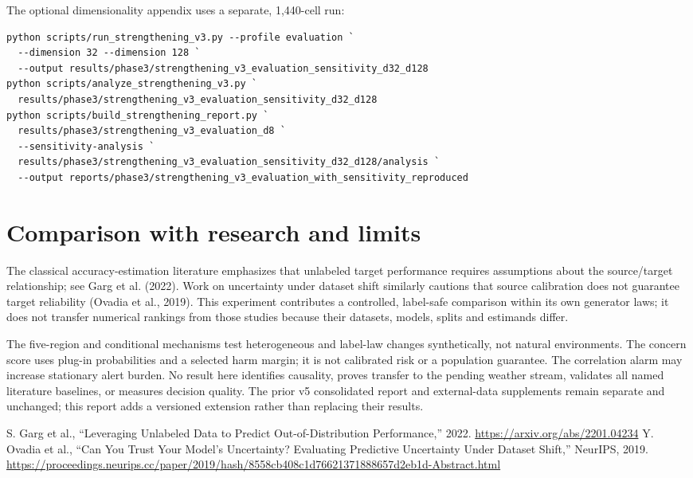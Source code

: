 \documentclass[11pt,a4paper]{article}
\begin{document}
The optional dimensionality appendix uses a separate, 1,440-cell run:
\begin{verbatim}
python scripts/run_strengthening_v3.py --profile evaluation `
  --dimension 32 --dimension 128 `
  --output results/phase3/strengthening_v3_evaluation_sensitivity_d32_d128
python scripts/analyze_strengthening_v3.py `
  results/phase3/strengthening_v3_evaluation_sensitivity_d32_d128
python scripts/build_strengthening_report.py `
  results/phase3/strengthening_v3_evaluation_d8 `
  --sensitivity-analysis `
  results/phase3/strengthening_v3_evaluation_sensitivity_d32_d128/analysis `
  --output reports/phase3/strengthening_v3_evaluation_with_sensitivity_reproduced
\end{verbatim}

\section{Comparison with research and limits}
The classical accuracy-estimation literature emphasizes that unlabeled target performance requires assumptions about the source/target relationship; see Garg et al. (2022). Work on uncertainty under dataset shift similarly cautions that source calibration does not guarantee target reliability (Ovadia et al., 2019). This experiment contributes a controlled, label-safe comparison within its own generator laws; it does not transfer numerical rankings from those studies because their datasets, models, splits and estimands differ.

The five-region and conditional mechanisms test heterogeneous and label-law changes synthetically, not natural environments. The concern score uses plug-in probabilities and a selected harm margin; it is not calibrated risk or a population guarantee. The correlation alarm may increase stationary alert burden. No result here identifies causality, proves transfer to the pending weather stream, validates all named literature baselines, or measures decision quality. The prior v5 consolidated report and external-data supplements remain separate and unchanged; this report adds a versioned extension rather than replacing their results.

\begin{thebibliography}{9}
S. Garg et al., ``Leveraging Unlabeled Data to Predict Out-of-Distribution Performance,'' 2022. \url{https://arxiv.org/abs/2201.04234}
Y. Ovadia et al., ``Can You Trust Your Model's Uncertainty? Evaluating Predictive Uncertainty Under Dataset Shift,'' NeurIPS, 2019. \url{https://proceedings.neurips.cc/paper/2019/hash/8558cb408c1d76621371888657d2eb1d-Abstract.html}
\end{thebibliography}
\end{document}
